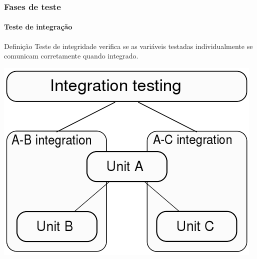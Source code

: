 \begin{frame}
\label{concept:teste-de-integracao}
\frametitle{Fases de teste}
\framesubtitle{Teste de integração}

\begin{block:concept}{Definição}
Teste de integridade verifica se as variáveis testadas individualmente se comunicam corretamente quando integrado.
\end{block:concept}

\begin{block:fact}{}
    \centering
    \includegraphics[scale=.3]{teste-de-software/conceitos-basicos/Imagens/integration-testing}
\end{block:fact}

\hfill
{}
\end{frame}



